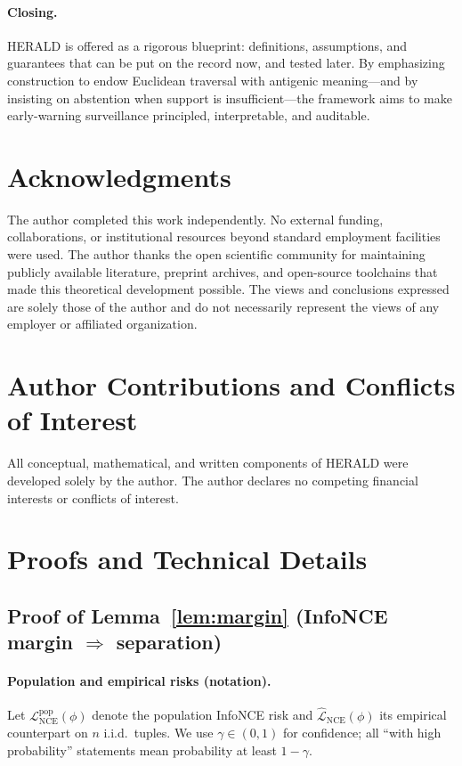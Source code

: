 \documentclass[11pt]{article}
\begin{document}
\paragraph{Closing.}
\textsc{HERALD} is offered as a rigorous blueprint: definitions, assumptions, and guarantees that can be put on the record now, and tested later. By emphasizing construction to endow Euclidean traversal with antigenic meaning—and by insisting on abstention when support is insufficient—the framework aims to make early-warning surveillance principled, interpretable, and auditable.

\section*{Acknowledgments}
The author completed this work independently. No external funding, collaborations, or institutional resources beyond standard employment facilities were used. 
The author thanks the open scientific community for maintaining publicly available literature, preprint archives, and open-source toolchains that made this theoretical development possible. 
The views and conclusions expressed are solely those of the author and do not necessarily represent the views of any employer or affiliated organization.

\section*{Author Contributions and Conflicts of Interest}
All conceptual, mathematical, and written components of \textsc{HERALD} were developed solely by the author. 
The author declares no competing financial interests or conflicts of interest.

\appendix
\section{Proofs and Technical Details}
\label{app:proofs}

\subsection{\quad Proof of Lemma~\ref{lem:margin} (InfoNCE margin $\Rightarrow$ separation)}
\label{app:lemma}

\paragraph{Population and empirical risks (notation).}
Let $\mathcal{L}_{\mathrm{NCE}}^{\mathrm{pop}}(\phi)$ denote the population InfoNCE risk and
$\widehat{\mathcal{L}}_{\mathrm{NCE}}(\phi)$ its empirical counterpart on $n$ i.i.d.\ tuples.
We use $\gamma\in(0,1)$ for confidence; all ``with high probability'' statements mean probability at least $1-\gamma$.
\end{document}
